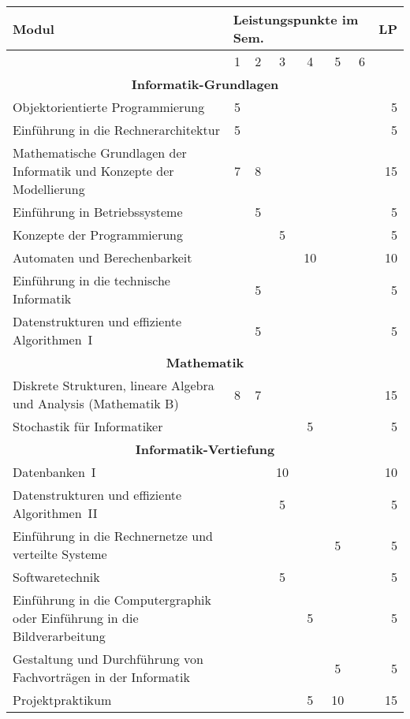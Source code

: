 \begin{table}[tbp]
	\begin{small}
		\begin{tabularx}{\textwidth}{|X||c|c|c|c|c|c||r|}
			\hline
			\textbf{Modul}&\multicolumn{6}{l||}{\textbf{Leistungspunkte im Sem.}}&\textbf{LP}\\\hline
			&1&2&3&4&5&6&\\\hline\hline
			\multicolumn{8}{|c|}{\textbf{Informatik-Grundlagen}}\\\hline
			Objektorientierte Programmierung&5&&&&&&5\\\hline
			Einführung in die Rechnerarchitektur&5&&&&&&5\\\hline
			Mathematische Grundlagen der Informatik und Konzepte der Modellierung &7&8&&&&&15\\\hline
			Einführung in Betriebssysteme&&5&&&&&5\\\hline
			Konzepte der Programmierung&&&5&&&&5\\\hline
			Automaten und Berechenbarkeit&&&&10&&&10\\\hline
			Einführung in die technische Informatik&&5&&&&&5\\\hline
			Datenstrukturen und effiziente Algorithmen~I&&5&&&&&5\\\hline\hline
			\multicolumn{8}{|c|}{\textbf{Mathematik}}\\\hline
			Diskrete Strukturen, lineare Algebra und Analysis (Mathematik B)&8&7&&&&&15\\\hline
			Stochastik für Informatiker&&&&5&&&5\\\hline\hline
			\multicolumn{8}{|c|}{\textbf{Informatik-Vertiefung}}\\\hline
			Datenbanken~I&&&10&&&&10\\\hline
			Datenstrukturen und effiziente Algorithmen~II&&&5&&&&5\\\hline
			Einführung in die Rechnernetze und verteilte Systeme&&&&&5&&5\\\hline
			Softwaretechnik&&&5&&&&5\\\hline
			Einführung in die Computergraphik oder Einführung in die Bildverarbeitung&&&&5&&&5\\\hline
			Gestaltung und Durchführung von Fachvorträgen in der Informatik&&&&&5&&5\\\hline
			Projektpraktikum&&&&5&10&&15\\\hline\hline

\end{tabularx}
\end{small}
\end{table}
